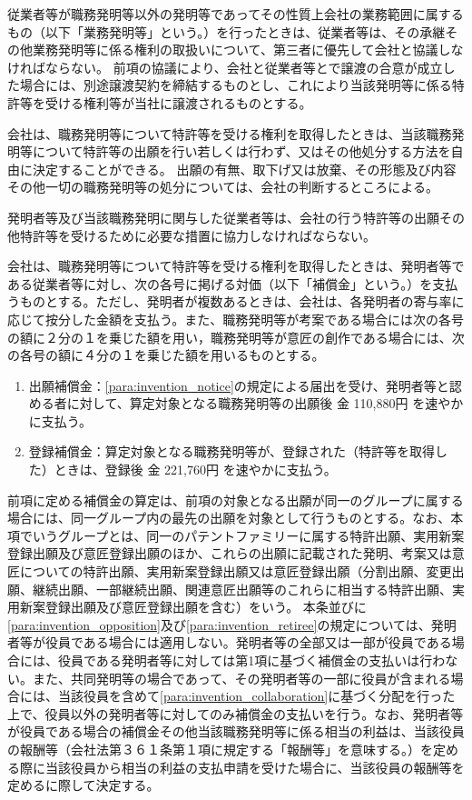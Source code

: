 \documentclass[10pt,a4paper,uplatex]{jsarticle}
\begin{document}
従業者等が職務発明等以外の発明等であってその性質上会社の業務範囲に属するもの（以下「業務発明等」という。）を行ったときは、従業者等は、その承継その他業務発明等に係る権利の取扱いについて、第三者に優先して会社と協議しなければならない。
\term 前項の協議により、会社と従業者等とで譲渡の合意が成立した場合には、別途譲渡契約を締結するものとし、これにより当該発明等に係る特許等を受ける権利等が当社に譲渡されるものとする。

会社は、職務発明等について特許等を受ける権利を取得したときは、当該職務発明等について特許等の出願を行い若しくは行わず、又はその他処分する方法を自由に決定することができる。
\term 出願の有無、取下げ又は放棄、その形態及び内容その他一切の職務発明等の処分については、会社の判断するところによる。

発明者等及び当該職務発明に関与した従業者等は、会社の行う特許等の出願その他特許等を受けるために必要な措置に協力しなければならない。

会社は、職務発明等について特許等を受ける権利を取得したときは、発明者等である従業者等に対し、次の各号に掲げる対価（以下「補償金」という。）を支払うものとする。ただし、発明者が複数あるときは、会社は、各発明者の寄与率に応じて按分した金額を支払う。また、職務発明等が考案である場合には次の各号の額に２分の１を乗じた額を用い，職務発明等が意匠の創作である場合には、次の各号の額に４分の１を乗じた額を用いるものとする。
\begin{enumerate}
    \item 出願補償金：\ref{para:invention_notice}の規定による届出を受け、発明者等と認める者に対して、算定対象となる職務発明等の出願後 金 110,880円 を速やかに支払う。
    \item 登録補償金：算定対象となる職務発明等が、登録された（特許等を取得した）ときは、登録後 金 221,760円 を速やかに支払う。
\end{enumerate}
\label{para:invention_compensation}
\term 前項に定める補償金の算定は、前項の対象となる出願が同一のグループに属する場合には、同一グループ内の最先の出願を対象として行うものとする。なお、本項でいうグループとは、同一のパテントファミリーに属する特許出願、実用新案登録出願及び意匠登録出願のほか、これらの出願に記載された発明、考案又は意匠についての特許出願、実用新案登録出願又は意匠登録出願（分割出願、変更出願、継続出願、一部継続出願、関連意匠出願等のこれらに相当する特許出願、実用新案登録出願及び意匠登録出願を含む）をいう。
\term 本条並びに\ref{para:invention_opposition}及び\ref{para:invention_retiree}の規定については、発明者等が役員である場合には適用しない。発明者等の全部又は一部が役員である場合には、役員である発明者等に対しては第1項に基づく補償金の支払いは行わない。また、共同発明等の場合であって、その発明者等の一部に役員が含まれる場合には、当該役員を含めて\ref{para:invention_collaboration}に基づく分配を行った上で、役員以外の発明者等に対してのみ補償金の支払いを行う。なお、発明者等が役員である場合の補償金その他当該職務発明等に係る相当の利益は、当該役員の報酬等（会社法第３６１条第１項に規定する「報酬等」を意味する。）を定める際に当該役員から相当の利益の支払申請を受けた場合に、当該役員の報酬等を定めるに際して決定する。
\end{document}
